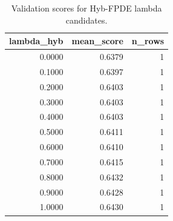 \begin{table}[t]
\caption{Validation scores for Hyb-FPDE lambda candidates.}
\label{tab:lambda_distribution_computed}
\centering
\begin{tabular}{rrr}
\toprule
lambda\_hyb & mean\_score & n\_rows \\
\midrule
0.0000 & 0.6379 & 1 \\
0.1000 & 0.6397 & 1 \\
0.2000 & 0.6403 & 1 \\
0.3000 & 0.6403 & 1 \\
0.4000 & 0.6403 & 1 \\
0.5000 & 0.6411 & 1 \\
0.6000 & 0.6410 & 1 \\
0.7000 & 0.6415 & 1 \\
0.8000 & 0.6432 & 1 \\
0.9000 & 0.6428 & 1 \\
1.0000 & 0.6430 & 1 \\
\bottomrule
\end{tabular}

\end{table}
